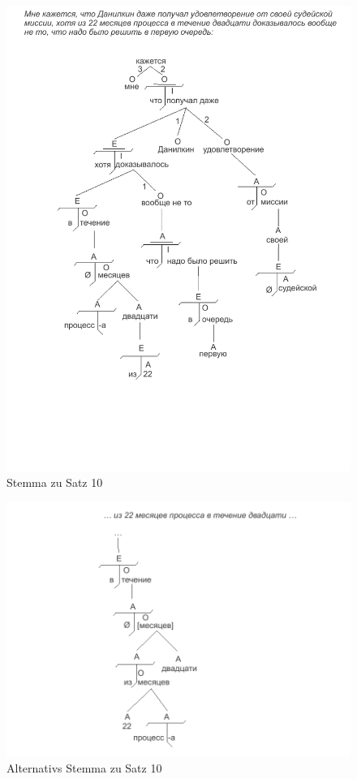 \begin{figure}
    \begin{center}
        \includegraphics{anhang_a/stemma10}
        \caption{Stemma zu Satz 10}
        \label{fig:stemma10}
    \end{center}
\end{figure}

\begin{figure}
    \begin{center}
        \includegraphics{anhang_a/stemma10a}
        \caption{Alternativs Stemma zu Satz 10}
        \label{fig:stemma10a}
    \end{center}
\end{figure}

